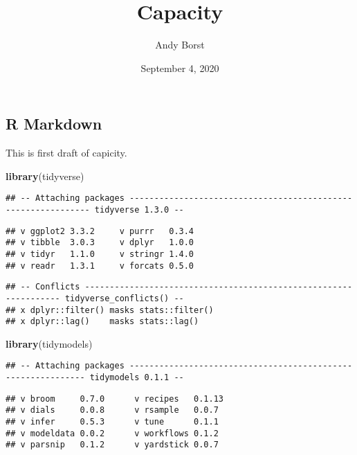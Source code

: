 \documentclass[]{article}
\title{Capacity}
\author{Andy Borst}
\date{September 4, 2020}
\newenvironment{Shaded}{\begin{snugshade}}{\end{snugshade}}
\newcommand{\KeywordTok}[1]{\textcolor[rgb]{0.13,0.29,0.53}{\textbf{#1}}}
\newcommand{\NormalTok}[1]{#1}
\begin{document}
\maketitle

\subsection{R Markdown}\label{r-markdown}

This is first draft of capicity.

\begin{Shaded}
\begin{Highlighting}[]
\KeywordTok{library}\NormalTok{(tidyverse)}
\end{Highlighting}
\end{Shaded}

\begin{verbatim}
## -- Attaching packages -------------------------------------------------------------- tidyverse 1.3.0 --
\end{verbatim}

\begin{verbatim}
## v ggplot2 3.3.2     v purrr   0.3.4
## v tibble  3.0.3     v dplyr   1.0.0
## v tidyr   1.1.0     v stringr 1.4.0
## v readr   1.3.1     v forcats 0.5.0
\end{verbatim}

\begin{verbatim}
## -- Conflicts ----------------------------------------------------------------- tidyverse_conflicts() --
## x dplyr::filter() masks stats::filter()
## x dplyr::lag()    masks stats::lag()
\end{verbatim}

\begin{Shaded}
\begin{Highlighting}[]
\KeywordTok{library}\NormalTok{(tidymodels)}
\end{Highlighting}
\end{Shaded}

\begin{verbatim}
## -- Attaching packages ------------------------------------------------------------- tidymodels 0.1.1 --
\end{verbatim}

\begin{verbatim}
## v broom     0.7.0      v recipes   0.1.13
## v dials     0.0.8      v rsample   0.0.7 
## v infer     0.5.3      v tune      0.1.1 
## v modeldata 0.0.2      v workflows 0.1.2 
## v parsnip   0.1.2      v yardstick 0.0.7
\end{verbatim}
\end{document}
